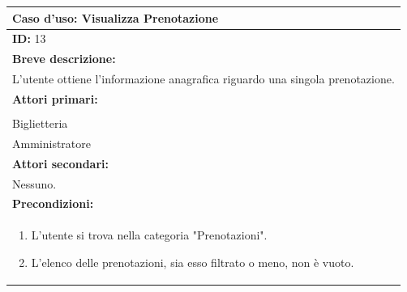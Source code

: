 \documentclass{article}
\begin{document}
                \begin{table}[H]
                    \begin{tabular}{|p{\linewidth}|}
                        \hline
                        \cellcolor{gray!100}
                        \color{white}
                        \centerline{\textbf{Caso d'uso:} Visualizza Prenotazione} \\
                        \hline
                        \textbf{ID:} 13 \\
                        \hline
                        \cellcolor{gray!20}
                        \textbf{Breve descrizione:} \\
                        \cellcolor{gray!20}
                        L'utente ottiene l'informazione anagrafica riguardo una singola prenotazione. \\
                        \hline
                        \textbf{Attori primari:} \\
                        \begin{minipage}{\linewidth}
                            Cliente \\
                            Biglietteria \\
                            Amministratore
                        \end{minipage}
                        \vspace{0pt} \\
                        \hline
                        \textbf{Attori secondari:} \\
                        Nessuno. \\
                        \hline
                        \cellcolor{gray!20}
                        \textbf{Precondizioni:} \\
                        \cellcolor{gray!20}
                        \begin{minipage}{\linewidth}
                            \begin{enumerate}
                                \item L'utente si trova nella categoria "Prenotazioni". %
                                \item L'elenco delle prenotazioni, sia esso filtrato o meno, non è vuoto.
                            \end{enumerate}
                        \end{minipage}

\end{tabular}
\end{table}
\end{document}
